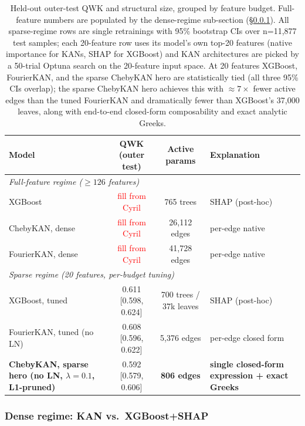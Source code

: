 \begin{table}[H]
\centering
\caption{Held-out outer-test QWK and structural size, grouped by feature budget. Full-feature numbers are populated by the dense-regime sub-section (\S\ref{sec:interpretability_dense}). All sparse-regime rows are single retrainings with 95\% bootstrap CIs over n{=}11{,}877 test samples; each 20-feature row uses its model's own top-20 features (native importance for KANs, SHAP for XGBoost) and KAN architectures are picked by a 50-trial Optuna search on the 20-feature input space. At 20 features XGBoost, FourierKAN, and the sparse ChebyKAN hero are statistically tied (all three 95\% CIs overlap); the sparse ChebyKAN hero achieves this with $\approx 7\times$ fewer active edges than the tuned FourierKAN and dramatically fewer than XGBoost's 37{,}000 leaves, along with end-to-end closed-form composability and exact analytic Greeks.}
\label{tab:interpretability_outer_test}
\footnotesize
\begin{tabular}{lccl}
\hline
Model & QWK (outer test) & Active params & Explanation \\
\hline
\multicolumn{4}{l}{\emph{Full-feature regime ($\geq 126$ features)}} \\
XGBoost                    & \textcolor{red}{fill from Cyril} & 765 trees & SHAP (post-hoc) \\
ChebyKAN, dense            & \textcolor{red}{fill from Cyril} & 26{,}112 edges    & per-edge native \\
FourierKAN, dense          & \textcolor{red}{fill from Cyril} & 41{,}728 edges    & per-edge native \\
\hline
\multicolumn{4}{l}{\emph{Sparse regime (20 features, per-budget tuning)}} \\
XGBoost, tuned             & 0.611 [0.598, 0.624] & 700 trees / 37k leaves & SHAP (post-hoc) \\
FourierKAN, tuned (no LN)  & 0.608 [0.596, 0.622] & 5{,}376 edges & per-edge closed form \\
\textbf{ChebyKAN, sparse hero (no LN, $\lambda{=}0.1$, L1-pruned)} & 0.592 [0.579, 0.606] & \textbf{806 edges} & \textbf{single closed-form expression + exact Greeks} \\
\hline
\end{tabular}
\end{table}

\subsubsection{Dense regime: KAN vs.\ XGBoost+SHAP}
\label{sec:interpretability_dense}

